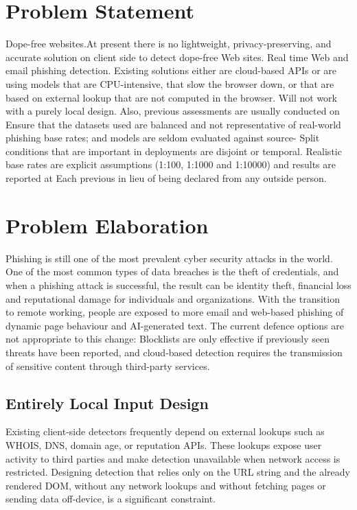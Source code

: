 \documentclass{FastFyp}
\begin{document}
\section{Problem Statement}
\label{sec:problem-statement}
Dope-free websites.At present there is no lightweight, privacy-preserving, and accurate solution on client side to detect dope-free Web sites.
Real time Web and email phishing detection. Existing solutions either are cloud-based APIs or are using
models that are CPU-intensive, that slow the browser down, or that are based on external lookup that are not computed in the browser.
Will not work with a purely local design. Also, previous assessments are usually conducted on
Ensure that the datasets used are balanced and not representative of real-world phishing base rates; and models are seldom evaluated against source-
Split conditions that are important in deployments are disjoint or temporal. Realistic base rates are
explicit assumptions (1:100, 1:1000 and 1:10000) and results are reported at
Each previous in lieu of being declared from any outside person.


\section{Problem Elaboration}
\label{sec:problem-elaboration}
Phishing is still one of the most prevalent cyber security attacks in the world. One of the most common types of data breaches is the theft of credentials, and when a phishing attack is successful, the result can be identity theft, financial loss and reputational damage for individuals and organizations. With the transition to remote working, people are exposed to more email and web-based phishing of dynamic page behaviour and AI-generated text. The current defence options are not appropriate to this change: Blocklists are only effective if previously seen threats have been reported, and cloud-based detection requires the transmission of sensitive content through third-party services.

\subsection{Entirely Local Input Design}
Existing client-side detectors frequently depend on external lookups such as WHOIS, DNS, domain age, or reputation APIs. These lookups expose user activity to third parties and make detection unavailable when network access is restricted. Designing detection that relies only on the URL string and the already rendered DOM, without any network lookups and without fetching pages or sending data off-device, is a significant constraint.
\end{document}
